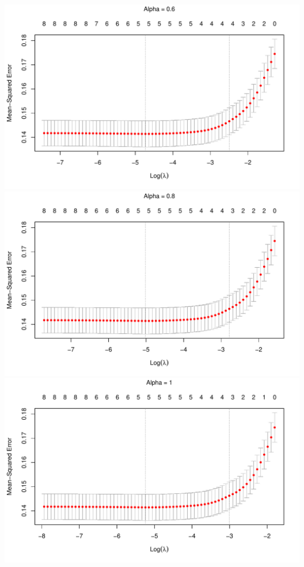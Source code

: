 \documentclass[
]{article}
\begin{document}
\includegraphics{A2_files/figure-latex/unnamed-chunk-7-4.pdf}
\includegraphics{A2_files/figure-latex/unnamed-chunk-7-5.pdf}
\includegraphics{A2_files/figure-latex/unnamed-chunk-7-6.pdf}
\end{document}
